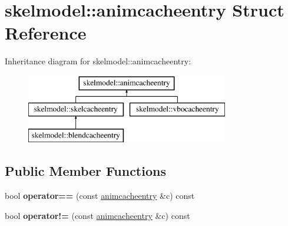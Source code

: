 \hypertarget{structskelmodel_1_1animcacheentry}{}\section{skelmodel\+:\+:animcacheentry Struct Reference}
\label{structskelmodel_1_1animcacheentry}
Inheritance diagram for skelmodel\+:\+:animcacheentry\+:\begin{figure}[H]
\begin{center}
\leavevmode
\includegraphics[height=3.000000cm]{structskelmodel_1_1animcacheentry}
\end{center}
\end{figure}
\subsection*{Public Member Functions}
\begin{DoxyCompactItemize}
\item 
\mbox{\label{structskelmodel_1_1animcacheentry_a4fe8efdca5b85d720bcd73e3fc0791d0}} 
bool {\bfseries operator==} (const \hyperlink{structskelmodel_1_1animcacheentry}{animcacheentry} \&c) const
\item 
\mbox{\label{structskelmodel_1_1animcacheentry_a33723521ed91c43b0ec9403f01848e3a}} 
bool {\bfseries operator!=} (const \hyperlink{structskelmodel_1_1animcacheentry}{animcacheentry} \&c) const
\end{DoxyCompactItemize}
